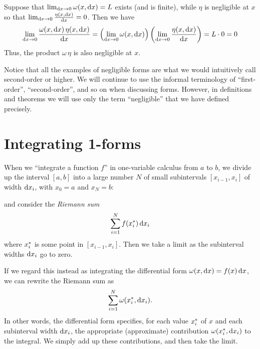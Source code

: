 \begin{eg}
  Suppose that $\lim_{{\mathrm{d} x}\to 0} \omega(x,{\mathrm{d} x}) = L$ exists (and is finite), while $\eta$ is negligible at $x$ so that $\lim_{{\mathrm{d} x}\to 0} \frac{\eta(x,{\mathrm{d} x})}{{\mathrm{d} x}}= 0$.
  Then we have
  \[ \lim_{{\mathrm{d} x}\to 0} \frac{\omega(x,{\mathrm{d} x}) \, \eta(x,{\mathrm{d} x})}{{\mathrm{d} x}} = \left(\lim_{{\mathrm{d} x}\to 0} \omega(x,{\mathrm{d} x})\right) \left(\lim_{{\mathrm{d} x}\to 0} \frac{\eta(x,{\mathrm{d} x})}{{\mathrm{d} x}}\right) = L \cdot 0 = 0 \]
  Thus, the product $\omega\,\eta$ is also negligible at $x$.
\end{eg}

Notice that all the examples of negligible forms are what we would intuitively call second-order or higher.
We will continue to use the informal terminology of ``first-order'', ``second-order'', and so on when discussing forms.
However, in definitions and theorems we will use only the term ``negligible'' that we have defined precisely.

\section{Integrating 1-forms}
\label{sec:1d-integration}

When we ``integrate a function $f$'' in one-variable calculus from $a$ to $b$, we divide up the interval $[a,b]$ into a large number $N$ of small subintervals $[x_{i-1},x_i]$ of width ${\mathrm{d} x}_i$, with $x_0 = a$ and $x_N=b$:
\begin{center}
\end{center}

and consider the \emph{Riemann sum}
\[ \sum_{i=1}^N f({x}_{i}^*)\, {\mathrm{d} x}_i \]
where ${x}_{i}^*$ is some point in $[x_{i-1},x_i]$.
Then we take a limit as the subinterval widths ${\mathrm{d} x}_i$ go to zero.

If we regard this instead as integrating the differential form $\omega(x,{\mathrm{d} x}) = f(x)\, {\mathrm{d} x}$, we can rewrite the Riemann sum as
\[ \sum_{i=1}^N \omega({x}_{i}^*,{\mathrm{d} x}_i). \]
In other words, the differential form specifies, for each value ${x}_{i}^*$ of $x$ and each subinterval width ${\mathrm{d} x}_i$, the appropriate (approximate) contribution $\omega({x}_{i}^*,{\mathrm{d} x}_i)$ to the integral.
We simply add up these contributions, and then take the limit.

